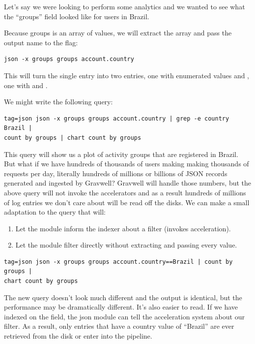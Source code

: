 Let's say we were looking to perform some analytics and we wanted to see
what the ``groups'' field looked like for users in Brazil. 

Because groups is an array of values, we will extract 
the array and pass the output name to the  flag:

\begin{Verbatim}
json -x groups groups account.country
\end{Verbatim}

This will turn the single entry into two entries, one with enumerated values  and
, one with  and . 

We might write the following query:

\begin{Verbatim}[breaklines=true]
tag=json json -x groups groups account.country | grep -e country Brazil |
count by groups | chart count by groups
\end{Verbatim}

This query will show us a plot of activity groups that are registered
in Brazil. But what if we
have hundreds of thousands of users making making thousands of requests
per day, literally hundreds of millions or billions of JSON records
generated and ingested by Gravwell? Gravwell will handle those numbers,
but the above query will not invoke the accelerators and as a result
hundreds of millions of log entries we don't care about will be read off the disks.
We can make a small adaptation to the query that will:

\begin{enumerate}
\item
  Let the  module inform the indexer about a filter (invokes
  acceleration).
\item
  Let the  module filter directly without extracting and
  passing every value.
\end{enumerate}

\begin{Verbatim}[breaklines=true]
tag=json json -x groups groups account.country==Brazil | count by groups |
chart count by groups
\end{Verbatim}

The new query doesn't look much different and the output is identical,
but the performance may be dramatically different. It's also easier to read. If we have indexed
on the  field, the json module can tell the acceleration system
about our filter. As a result, only entries that have a country value of
``Brazil'' are ever retrieved from the disk or enter into the
pipeline.

